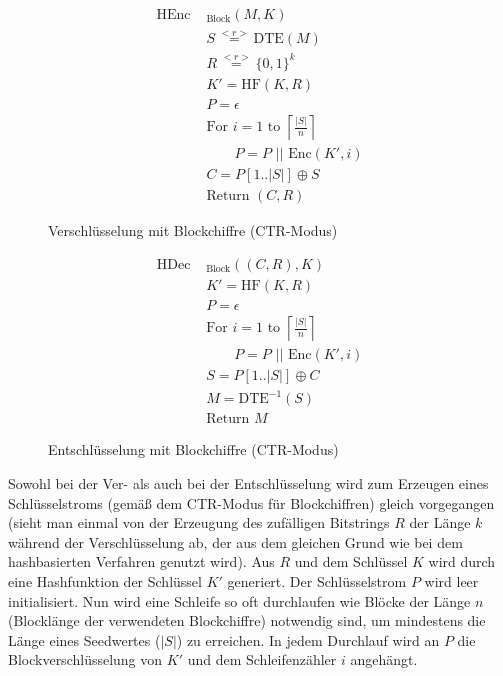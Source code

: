 \begin{figure}[h]
	\begin{minipage}[b]{0.5\textwidth}
		\begin{align*}
			\text{HEnc }&_{\text{Block}}(M, K)\\
			&S \overset{<r>}{=} \text{DTE}(M)\\ 	%
			&R \overset{<r>}{=} \{0,1\}^k\\	%
			&K' = \text{HF}(K,R)\\ 		%
			&P = \epsilon \\
			&\text{For } i = 1 \text{ to } \left\lceil \frac{|S|}{n} \right\rceil \\
			&\qquad P = P \text{ || Enc}(K',i)\\	%
			&C = P[1 .. |S|] \oplus S\\	%
			&\text{Return } (C,R)
		\end{align*}
		\caption{Verschlüsselung mit Blockchiffre (CTR-Modus)}
		\label{fig:BlockEnc}
	\end{minipage}
	\begin{minipage}[b]{0.5\textwidth}
		\begin{align*}
			\text{HDec }&_{\text{Block}}((C,R), K)\\
			&K' = \text{HF}(K,R)\\ 		%
			&P = \epsilon \\
			&\text{For } i = 1 \text{ to } \left\lceil \frac{|S|}{n} \right\rceil \\
			&\qquad P = P \text{ || Enc}(K',i)\\	%
			&S = P[1 .. |S|] \oplus C\\	%
			&M = \text{DTE}^{-1}(S)\\ 	%
			&\text{Return } M
		\end{align*}
		\caption{Entschlüsselung mit Blockchiffre (CTR-Modus)}
		\label{fig:BlockDec}
	\end{minipage}
\end{figure}

Sowohl bei der Ver- als auch bei der Entschlüsselung wird zum Erzeugen eines Schlüsselstroms (gemäß dem CTR-Modus für Blockchiffren) gleich vorgegangen (sieht man einmal von der Erzeugung des zufälligen Bitstrings \(R\) der Länge \(k\) während der Verschlüsselung ab, der aus dem gleichen Grund wie bei dem hashbasierten Verfahren genutzt wird). Aus \(R\) und dem Schlüssel \(K\) wird durch eine Hashfunktion der Schlüssel \(K'\) generiert. Der Schlüsselstrom \(P\) wird leer initialisiert. Nun wird eine Schleife so oft durchlaufen wie Blöcke der Länge \(n\) (Blocklänge der verwendeten Blockchiffre) notwendig sind, um mindestens die Länge eines Seedwertes (\(|S|\)) zu erreichen. In jedem Durchlauf wird an \(P\) die Blockverschlüsselung von \(K'\) und dem Schleifenzähler \(i\) angehängt.

